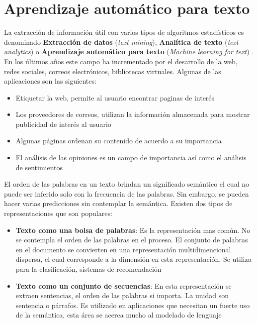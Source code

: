 
\section[AA Para texto]{Aprendizaje automático para texto}

La extracción de información útil con varios tipos de algoritmos estadísticos es denominado \textbf{Extracción de datos} (\textit{text mining}), \textbf{Analítica de texto} (\textit{text analytics}) o \textbf{Aprendizaje automático para texto} (\textit{Machine learning for text}) \citep{CD1}. En los últimos años este campo ha incrementado por el desarrollo de la web, redes sociales, correos electrónicos, bibliotecas virtuales. Algunas de las aplicaciones son las siguientes:

\begin{itemize}

	\item Etiquetar la web, permite al usuario encontrar paginas de interés

	\item Los proveedores de correos, utilizan la información almacenada para mostrar publicidad de interés al usuario

	\item Algunas páginas ordenan su contenido de acuerdo a su importancia

	\item El análisis de las opiniones es un campo de importancia así como el análisis de sentimientos		

\end{itemize}

El orden de las palabras en un texto brindan un significado semántico el cual no puede ser inferido  solo con la frecuencia de las palabras. Sin embargo, se pueden hacer varias predicciones sin contemplar la semántica. Existen dos tipos de representaciones que son populares:

\begin{itemize}
	\item \textbf{Texto como una bolsa de palabras}: Es la representación mas común. No se contempla el orden de las palabras en el proceso. El conjunto de palabras en el documento se convierten en una representación multidimencional dispersa, el cual corresponde a la dimensión en esta representación. Se utiliza para la clasificación, sistemas de recomendación

	\item \textbf{Texto como un conjunto de secuencias}: En esta representación se extraen sentencias, el orden de las palabras si importa. La unidad son sentencia o párrafos. Es utilizado en aplicaciones que necesitan un fuerte uso de la semántica, esta área se acerca mucho al modelado de lenguaje
\end{itemize}


